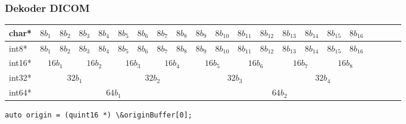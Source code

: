 \documentclass[aspectratio=169]{beamer}
\begin{document}
\begin{frame}[t]
    \frametitle{Dekoder DICOM}
    \begin{center}
        \footnotesize
        \def\arraystretch{1.5}
        \setlength{\tabcolsep}{5pt}
        \begin{tabular}{|l|c|c|c|c|c|c|c|c|c|c|c|c|c|c|c|c|c|c|c|c|}
            \hline
            char*  & $8b_1$                        & $8b_2$                        & $8b_3$                        & $8b_4$                        & $8b_5$                        & $8b_6$                        & $8b_7$                        & $8b_8$                        & $8b_9$ & $8b_{10}$ & $8b_{11}$ & $8b_{12}$ & $8b_{13}$ & $8b_{14}$ & $8b_{15}$ & $8b_{16}$ \\
            \hline
            int8*  & $8b_1$                        & $8b_2$                        & $8b_3$                        & $8b_4$                        & $8b_5$                        & $8b_6$                        & $8b_7$                        & $8b_8$                        & $8b_9$ & $8b_{10}$ & $8b_{11}$ & $8b_{12}$ & $8b_{13}$ & $8b_{14}$ & $8b_{15}$ & $8b_{16}$ \\
            \hline
            int16* & \multicolumn{2}{|c|}{$16b_1$} & \multicolumn{2}{|c|}{$16b_2$} & \multicolumn{2}{|c|}{$16b_3$} & \multicolumn{2}{|c|}{$16b_4$} & \multicolumn{2}{|c|}{$16b_5$} & \multicolumn{2}{|c|}{$16b_6$} & \multicolumn{2}{|c|}{$16b_7$} & \multicolumn{2}{|c|}{$16b_8$}                                                                                              \\
            \hline
            int32* & \multicolumn{4}{|c|}{$32b_1$} & \multicolumn{4}{|c|}{$32b_2$} & \multicolumn{4}{|c|}{$32b_3$} & \multicolumn{4}{|c|}{$32b_4$}                                                                                                                                                                                                                              \\
            \hline
            int64* & \multicolumn{8}{|c|}{$64b_1$} & \multicolumn{8}{|c|}{$64b_2$}                                                                                                                                                                                                                                                                                              \\
            \hline
        \end{tabular}
    \end{center}

    
\begin{lstlisting}
auto origin = (quint16 *) \&originBuffer[0];
\end{lstlisting}

\end{frame}
\end{document}
